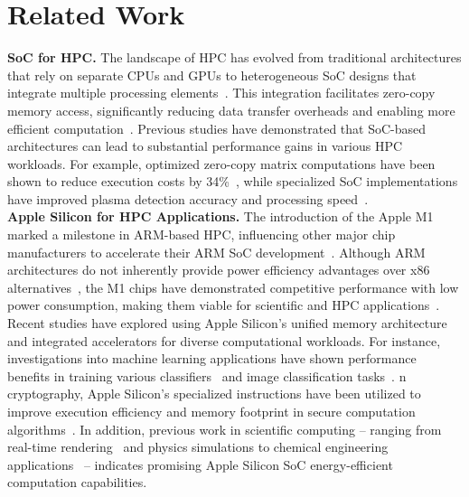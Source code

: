 \section{Related Work}
\noindent  \textbf{SoC for HPC.} The landscape of HPC has evolved from traditional architectures that rely on separate CPUs and GPUs to heterogeneous SoC designs that integrate multiple processing elements~\cite{kenyon_apple_2022, chien_adaptive_2014, gao_survey_2016}.  This integration facilitates zero-copy memory access, significantly reducing data transfer overheads and enabling more efficient computation~\cite{kenyon_apple_2022}. Previous studies have demonstrated that SoC-based architectures can lead to substantial performance gains in various HPC workloads. For example, optimized zero-copy matrix computations have been shown to reduce execution costs by 34\%~\cite{kato_zero-copy_2013}, while specialized SoC implementations have improved plasma detection accuracy and processing speed~\cite{jablonski_implementation_2021}. \\

\noindent  \textbf{Apple Silicon for HPC Applications.} The introduction of the Apple M1 marked a milestone in ARM-based HPC, influencing other major chip manufacturers to accelerate their ARM SoC development~\cite{liao_impacts_2022}. Although ARM architectures do not inherently provide power efficiency advantages over x86 alternatives~\cite{sankaralingam_detailed_2013}, the M1 chips have demonstrated competitive performance with low power consumption, making them viable for scientific and HPC applications~\cite{kenyon_apple_2022}. Recent studies have explored using Apple Silicon’s unified memory architecture and integrated accelerators for diverse computational workloads. For instance, investigations into machine learning applications have shown performance benefits in training various classifiers~\cite{franco_exploring_2024} and image classification tasks~\cite{kasperek_comparison_2022}. n cryptography, Apple Silicon’s specialized instructions have been utilized to improve execution efficiency and memory footprint in secure computation algorithms~\cite{filho_fast_2024, cryptoeprint:2024/195, zheng_espm-d_2024}.  In addition, previous work in scientific computing -- ranging from real-time rendering~\cite{takeshita_acto3d_2024} and physics simulations \cite{gebraad_seamless_2023} to chemical engineering applications~\cite{cho_performance_2024} -- indicates promising Apple Silicon SoC energy-efficient computation capabilities.